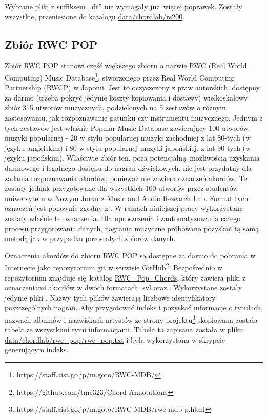 Wybrane pliki z suffiksem ,,dt'' nie wymagały już więcej poprawek. Zostały wszystkie, przeniesione
do katalogu \url{data/chordlab/rs200}.

\subsection{Zbiór RWC POP}

Zbiór RWC POP \cite{goto_rwc_nodate} stanowi część większego zbioru o nazwie RWC (Real World
Computing) Music Database\footnote{https://staff.aist.go.jp/m.goto/RWC-MDB/}, stworzonego przez Real
World Computing Partnership (RWCP) w Japonii. Jest to oczyszczony z praw autorskich, dostępny za
darmo (trzeba pokryć jedynie koszty kopiowania i dostawy) wielkoskalowy zbiór 315 utworów
muzycznych, podzielonych na 5 zestawów o różnym zastosowaniu, jak rozpoznawanie gatunku czy
instrumentu muzycznego. Jednym z tych zestawów jest właśnie Popular Music Database zawierający 100
utworów muzyki popularnej - 20 w stylu popularnej muzyki zachodniej z lat 80-tych (w języku
angielskim) i 80 w stylu popularnej muzyki japońskiej, z lat 90-tych (w języku japońskim). Właściwie
zbiór ten, poza potencjalną możliwością uzyskania darmowego i legalnego dostępu do nagrań
dźwiękowych, nie jest przydatny dla zadania rozpoznawania akordów, ponieważ nie zawiera oznaczeń
akordów. Te zostały jednak przygotowane dla wszystkich 100 utworów przez studentów uniwersytetu w
Nowym Jorku z Music and Audio Research Lab. Format tych oznaczeń jest ponownie zgodny z
\cite{harte_towards_nodate}. W ramach niniejszej pracy wykorzystane zostały właśnie te oznaczenia.
Dla uproszczenia i zautomatyzowania całego procesu przygotowania danych, nagrania muzyczne próbowano
pozyskać tą samą metodą jak w przypadku pozostałych zbiorów danych.

Oznaczenia akordów do zbioru RWC POP są dostępne za darmo do pobrania w Internecie jako repozytorium
git w serwisie GitHub\footnote{https://github.com/tmc323/Chord-Annotations}. Bezpośrednio w
repozytorium znajduje się katalog \url{RWC\_Pop\_Chords}, który zawiera pliki z oznaczeniami akordów w
dwóch formatach: \url{svl} oraz . Wykorzystane zostały jedynie pliki . Nazwy
tych plików zawierają liczbowe identyfikatory poszczególnych nagrań. Aby przygotować indeks i
pozyskać informacje o tytułach, nazwach albumów i nazwiskach artystów ze strony
projektu\footnote{https://staff.aist.go.jp/m.goto/RWC-MDB/rwc-mdb-p.html} skopiowana została tabela
ze wszystkimi tymi informacjami. Tabela ta zapisana została w pliku
\url{data/chordlab/rwc\_pop/rwc\_pop.txt} i była wykorzystana w skrypcie generującym indeks.

